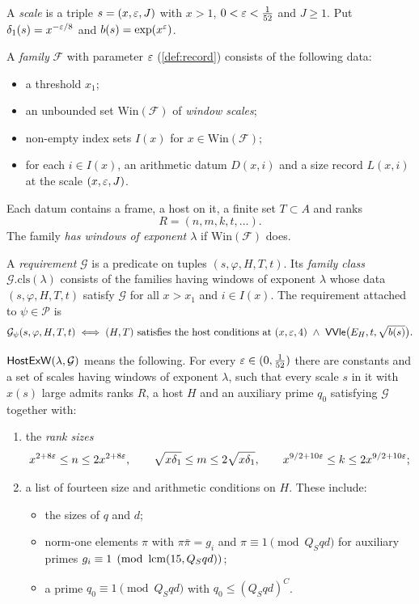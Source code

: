A \emph{scale} is a triple $s=(x,\varepsilon,J)$ with $x>1$, $0<\varepsilon<\frac1{52}$ and $J\ge1$. Put
$\delta_1(s)=x^{-\varepsilon/8}$ and $b(s)=\exp(x^\varepsilon)$.

A \emph{family} $\mathcal F$ with parameter $\varepsilon$ (\cref{def:record}) consists of the following data:
\begin{itemize}
\item a threshold $x_1$;
\item an unbounded set $\mathrm{Win}(\mathcal F)$ of \emph{window scales};
\item non-empty index sets $I(x)$ for $x\in\mathrm{Win}(\mathcal F)$;
\item for each $i\in I(x)$, an arithmetic datum $D(x,i)$ and a size record $L(x,i)$ at the scale
$(x,\varepsilon,J)$.
\end{itemize}
Each datum contains a frame, a host on it, a finite set $T\subset A$ and ranks
\[
R=(n,m,k,t,\dots).
\]
The family \emph{has windows of exponent $\lambda$} if $\mathrm{Win}(\mathcal F)$ does.

\begin{definition}[Requirements]\label{def:requirement}
A \emph{requirement} $\mathcal G$ is a predicate on tuples $(s,\varphi,H,T,t)$. Its \emph{family class}
$\mathcal G.\mathrm{cls}(\lambda)$ consists of the families having windows of exponent $\lambda$ whose
data $(s,\varphi,H,T,t)$ satisfy $\mathcal G$ for all $x>x_1$ and $i\in I(x)$. The requirement
attached to $\psi\in\mathcal P$ is
\[
\mathcal G_\psi(s,\varphi,H,T,t)\iff (H,T)\text{ satisfies the host conditions at }(x,\varepsilon,4)
\ \wedge\ \mathsf{VVle}\big(E_H,t,\sqrt{b(s)}\big).
\]
 
\end{definition}

\begin{definition}\label{def:hostexw}
$\mathsf{HostExW}(\lambda,\mathcal G)$ means the following. For every $\varepsilon\in(0,\frac1{52})$ there
are constants and a set of scales having windows of exponent $\lambda$, such that every scale $s$ in
it with $x(s)$ large admits ranks $R$, a host $H$ and an auxiliary prime $q_0$ satisfying
$\mathcal G$ together with:
\begin{enumerate}[label=(\roman*)]
\item the \emph{rank sizes}
\[
x^{2+8\varepsilon}\le n\le2x^{2+8\varepsilon},\qquad \sqrt{x\delta_1}\le m\le2\sqrt{x\delta_1},\qquad
x^{9/2+10\varepsilon}\le k\le2x^{9/2+10\varepsilon};
\]
\item a list of fourteen size and arithmetic conditions on $H$. These include:
  \begin{itemize}
  \item the sizes of $q$ and $d$;
  \item norm-one elements $\pi$ with $\pi\bar\pi=g_i$ and $\pi\equiv1\pmod{Q_Sqd}$ for auxiliary
  primes $g_i\equiv1\pmod{\operatorname{lcm}(15,Q_Sqd)}$;
  \item a prime $q_0\equiv1\pmod{Q_Sqd}$ with $q_0\le(Q_Sqd)^{C}$.
  \end{itemize}
\end{enumerate}
\end{definition}


